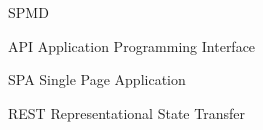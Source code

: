 \begin{listofabbrv}{SPMD}
        \item[API] Application Programming Interface 
        \item[SPA] Single Page Application
        \item[REST] Representational State Transfer
\end{listofabbrv}